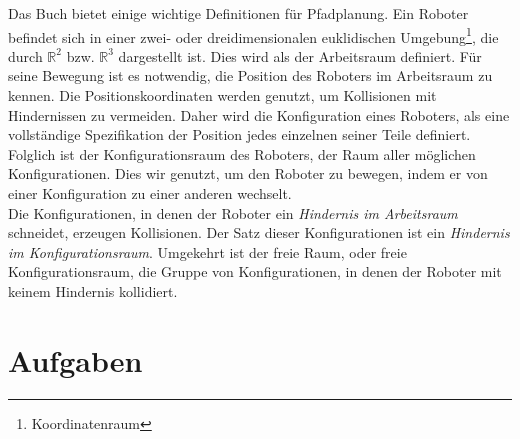 %
%
%
Das Buch \cite{Principles:05} bietet einige wichtige Definitionen für Pfadplanung. Ein Roboter befindet sich in einer zwei- oder dreidimensionalen euklidischen Umgebung\footnote{Koordinatenraum}, die durch $\mathbb{R}^{2}$ bzw. $\mathbb{R}^{3}$ dargestellt ist. Dies wird als der Arbeitsraum definiert. Für seine Bewegung ist es notwendig, die Position des Roboters im Arbeitsraum zu kennen. Die Positionskoordinaten werden genutzt, um Kollisionen mit Hindernissen zu vermeiden. Daher wird die Konfiguration eines Roboters, als eine vollständige Spezifikation der Position jedes einzelnen seiner Teile definiert. Folglich ist der Konfigurationsraum des Roboters, der Raum aller möglichen Konfigurationen. Dies wir genutzt, um den Roboter zu bewegen, indem er von einer Konfiguration zu einer anderen wechselt.\\
Die Konfigurationen, in denen der Roboter ein \textit{Hindernis im Arbeitsraum} schneidet, erzeugen Kollisionen. Der Satz dieser Konfigurationen ist ein \textit{Hindernis im Konfigurationsraum}. 
Umgekehrt ist der freie Raum, oder freie Konfigurationsraum, die Gruppe von Konfigurationen, in denen der Roboter mit keinem Hindernis kollidiert.


\section{Aufgaben} \label{AufgabenPP}


